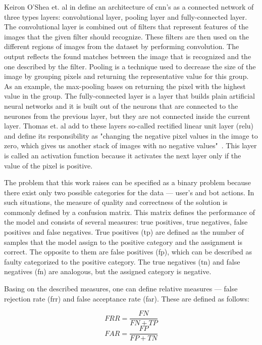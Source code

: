 Keiron O'Shea et. al in \cite{cnn-description} define an architecture of \gls{cnn}'s as a connected network of three types layers: convolutional layer, pooling layer and fully-connected layer.
The convolutional layer is combined out of filters that represent features of the images that the given filter should recognize.
These filters are then used on the different regions of images from the dataset by performing convolution.
The output reflects the found matches between the image that is recognized and the one described by the filter.
Pooling is a technique used to decrease the size of the image by grouping pixels and returning the representative value for this group.
As an example, the max-pooling bases on returning the pixel with the highest value in the group.
The fully-connected layer is a layer that builds plain artificial neural networks and it is built out of the neurons that are connected to the neurones from the previous layer, but they are not connected inside the current layer.
Thomas et. al add to these layers so-called rectified linear unit layer (\gls{relu}) and define its responsibility as "changing the negative pixel values in the image to zero, which gives us another stack of images with no negative values"~\cite{thomas2020machine}.
This layer is called an activation function because it activates the next layer only if the value of the pixel is positive.

The problem that this work raises can be specified as a binary problem because there exist only two possible categories for the data --- user's and bot actions.
In such situations, the measure of quality and correctness of the solution is commonly defined by a confusion matrix.
This matrix defines the performance of the model and consists of several measures: true positives, true negatives, false positives and false negatives.
True positives (\gls{tp}) are defined as the number of samples that the model assign to the positive category and the assignment is correct.
The opposite to them are false positives (\gls{fp}), which can be described as faulty categorized to the positive category.
The true negatives (\gls{tn}) and false negatives (\gls{fn}) are analogous, but the assigned category is negative.

Basing on the described measures, one can define relative measures --- false rejection rate (\gls{frr}) and false acceptance rate (\gls{far}).
These are defined as follows:

\begin{equation}
    FRR = \frac{FN}{FN + TP}\label{eq:frr}
\end{equation}
\begin{equation}
    FAR = \frac{FP}{FP + TN}\label{eq:far}
\end{equation}

